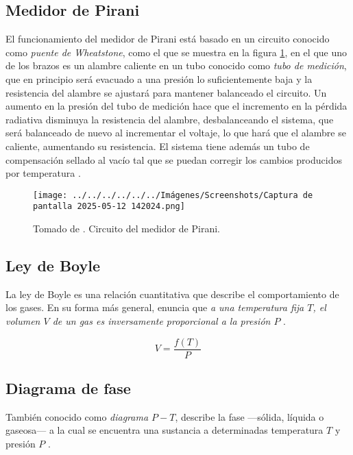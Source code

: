 \documentclass[final,5p,times,twocolumn, nopreprintline]{elsarticle}
\numberwithin{equation}{section}
\begin{document}
\subsection{Medidor de Pirani}

El funcionamiento del medidor de Pirani está basado en un circuito conocido como \emph{puente de Wheatstone}, como el que se muestra en la figura \ref{fig2}, en el que uno de los brazos es un alambre caliente en un tubo conocido como \emph{tubo de medición}, que en principio será evacuado a una presión lo suficientemente baja y la resistencia del alambre se ajustará para mantener balanceado el circuito. Un aumento en la presión del tubo de medición hace que el incremento en la pérdida radiativa disminuya la resistencia del alambre, desbalanceando el sistema, que será balanceado de nuevo al incrementar el voltaje, lo que hará que el alambre se caliente, aumentando su resistencia. El sistema tiene además un tubo de compensación sellado al vacío tal que se puedan corregir los cambios producidos por temperatura \cite{o2023users}.

\begin{figure}[h!]
\begin{center}
\texttt{[image: ../../../../../../Imágenes/Screenshots/Captura de pantalla 2025-05-12 142024.png]} 
\caption{Tomado de \cite{o2023users}. Circuito del medidor de Pirani.} \label{fig2}
\end{center}
\end{figure}

\subsection{Ley de Boyle}

La ley de Boyle es una relación cuantitativa que describe el comportamiento de los gases. En su forma más general, enuncia que \emph{a una temperatura fija $T$, el volumen $V$ de un gas es inversamente proporcional a la presión $P$} \cite{kondepudi2014modern}.

\begin{equation}
V=\dfrac{f(T)}{P} \label{eq2}
\end{equation}

\subsection{Diagrama de fase}

También conocido como \emph{diagrama $P-T$}, describe la fase —sólida, líquida o gaseosa— a la cual se encuentra una sustancia a determinadas temperatura $T$ y presión $P$ \cite{ccengel2019termodinamica}.
\end{document}
